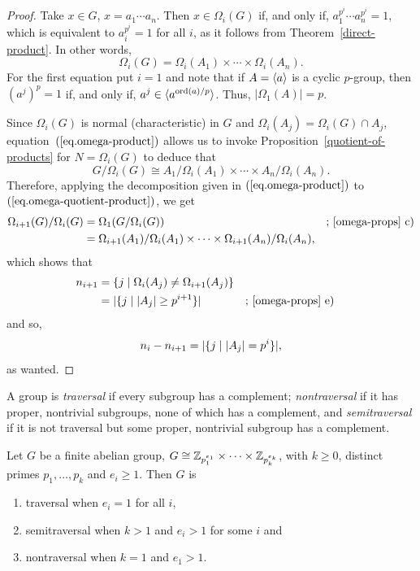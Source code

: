 \begin{proof} Take $x\in G$, $x=a_1\cdots a_n$. Then $x\in\Omega_i(G)$ if, and only if, $a_1^{p^i}\cdots a_n^{p^i}=1$, which is equivalent to $a_i^{p^i}=1$ for all $i$, as it follows from Theorem~\ref{direct-product}. In other words,
\begin{equation}\label{eq.omega-product}
    \Omega_i(G) = \Omega_i(A_1)\times\cdots\times\Omega_i(A_n).
\end{equation}
For the first equation put $i=1$ and note that if $A=\langle a\rangle$ is a cyclic $p$-group, then $(a^j)^p=1$ if, and only if, $a^j\in\langle a^{{\rm ord}(a)/p}\rangle$. Thus, $|\Omega_1(A)|=p$.

Since $\Omega_i(G)$ is normal (characteristic) in $G$ and $\Omega_i(A_j) =\Omega_i(G)\cap A_j$, equation~$(\ref{eq.omega-product})$ allows us to invoke Proposition~\ref{quotient-of-products} for $N=\Omega_i(G)$ to deduce that
\begin{equation}\label{eq.omega-quotient-product}
    G/\Omega_i(G) \cong A_1/\Omega_i(A_1)\times\cdots\times A_n/\Omega_i(A_n).
\end{equation}
Therefore, applying the decomposition given in $(\ref{eq.omega-product})$ to $(\ref{eq.omega-quotient-product})$, we get
\begin{align*}
    \Omega_{i+1}(G)/\Omega_i(G) &= \Omega_1(G/\Omega_i(G))
                &&\text{; \ref{omega-props} c)}\\
        &= \Omega_{i+1}(A_1)/\Omega_i(A_1)\times\cdots\times
            \Omega_{i+1}(A_n)/\Omega_i(A_n),
\end{align*}
which shows that
\begin{align*}
    n_{i+1} &= \set{j\mid \Omega_i(A_j)\ne\Omega_{i+1}(A_j)}\\
        &= |\set{j\mid|A_j|\ge p^{i+1}}| &&\text{;\ \ref{omega-props}~e)}
\end{align*}
and so,
$$
    n_i - n_{i+1} = |\{j\mid|A_j|=p^i\}|,
$$
as wanted.  \end{proof}

\begin{defn}
    A group is \textsl{traversal} if every subgroup has a complement; \textsl{nontraversal} if it has proper, nontrivial subgroups, none of which has a complement, and \textsl{semitraversal} if it is not traversal but some proper, nontrivial subgroup has a complement.
\end{defn}

\begin{thm}
    Let\/ $G$ be a finite abelian group, $G\cong \mathbb{Z}_{p_1^{e_1}}\times\cdots\times\mathbb{Z}_{p_k^{e_k}}$, with\/ $k\ge 0$, distinct primes\/ $p_1,\dots,p_k$ and\/ $e_i\ge1$. Then\/ $G$ is
    \begin{enumerate}[\upshape a)]
        \item traversal when\/ $e_i=1$ for all\/ $i$,
        \item semitraversal when\/ $k>1$ and\/ $e_i>1$ for some\/ $i$ and
        \item nontraversal when\/ $k=1$ and\/ $e_1>1$.
    \end{enumerate}
\end{thm}

